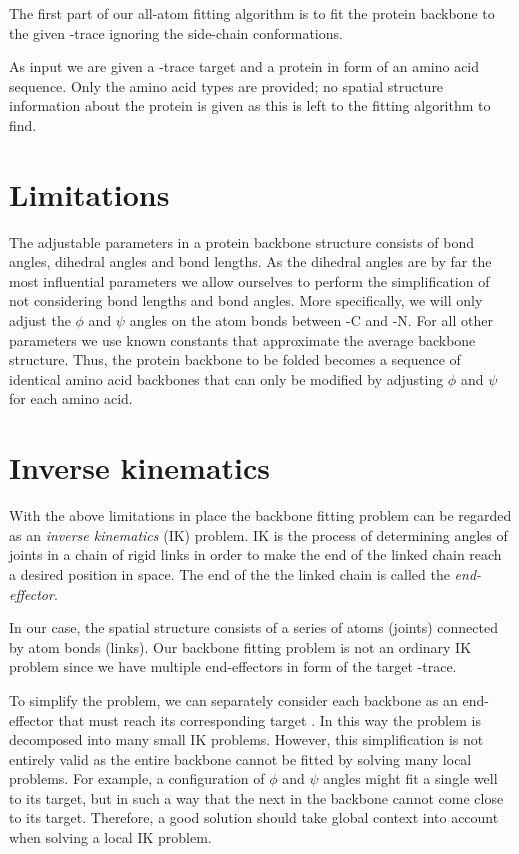 The first part of our all-atom fitting algorithm is to fit the protein backbone to the given \Ca-trace ignoring the side-chain conformations.

As input we are given a \Ca-trace target and a protein in form of an amino acid sequence.
Only the amino acid types are provided; no spatial structure information about the protein is given as this is left to the fitting algorithm to find.


\section{Limitations}
The adjustable parameters in a protein backbone structure consists of bond angles, dihedral angles and bond lengths.
As the dihedral angles are by far the most influential parameters we allow ourselves to perform the simplification of not considering bond lengths and bond angles.
More specifically, we will only adjust the $\phi$ and $\psi$ angles on the atom bonds between \Ca-C and \Ca-N.
For all other parameters we use known constants that approximate the average backbone structure.
Thus, the protein backbone to be folded becomes a sequence of identical amino acid backbones that can only be modified by adjusting $\phi$ and $\psi$ for each amino acid.


\section{Inverse kinematics}
With the above limitations in place the backbone fitting problem can be regarded as an \emph{inverse kinematics} (IK) problem.
IK is the process of determining angles of joints in a chain of rigid links in order to make the end of the linked chain reach a desired position in space.
The end of the the linked chain is called the \emph{end-effector}.

In our case, the spatial structure consists of a series of atoms (joints) connected by atom bonds (links).
Our backbone fitting problem is not an ordinary IK problem since we have multiple end-effectors in form of the target \Ca-trace.

To simplify the problem, we can separately consider each backbone \Ca as an end-effector that must reach its corresponding target \Ca.
In this way the problem is decomposed into many small IK problems.
However, this simplification is not entirely valid as the entire backbone cannot be fitted by solving many local problems.
For example, a configuration of $\phi$ and $\psi$ angles might fit a single \Ca well to its target, but in such a way that the next \Ca in the backbone cannot come close to its target.
Therefore, a good solution should take global context into account when solving a local IK problem. 

